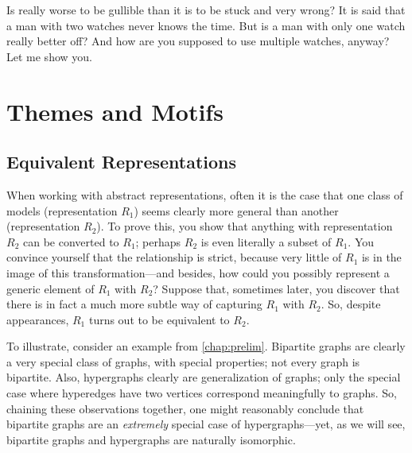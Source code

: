 %
Is really worse to be gullible than it is to be stuck and very wrong? 
It is said that a man with two watches never knows the time.  
But is a man with only one watch really better off?
And how are you supposed to use multiple watches, anyway?
Let me show you. 


\section{Themes and Motifs}

% 


%
\subsection{Equivalent Representations}


When working with abstract representations, often it is the case that one class of models (representation $R_1$) seems clearly more general than another (representation $R_2$).
To prove this, you show that anything with representation $R_2$ can be converted to $R_1$; perhaps $R_2$ is even literally a subset of $R_1$. 
You convince yourself that the relationship is strict, because very little of $R_1$ is in the image of this transformation---and besides, how could you possibly represent a generic element of $R_1$ with $R_2$? 
Suppose that, sometimes later,
 you discover that there is in fact a much more subtle way of capturing $R_1$ with $R_2$. 
So, despite appearances, $R_1$ turns out to be equivalent to $R_2$. 

To illustrate, consider an example from \cref{chap:prelim}. 
Bipartite graphs are clearly a very special class of graphs, with special properties; not every graph is bipartite. 
Also, hypergraphs clearly are generalization of graphs; only the special case where hyperedges have two vertices correspond meaningfully to graphs. 
So, chaining these observations together, one might reasonably conclude that bipartite graphs are an \emph{extremely} special case of hypergraphs---yet, as we will see, bipartite graphs and hypergraphs are naturally isomorphic. 


